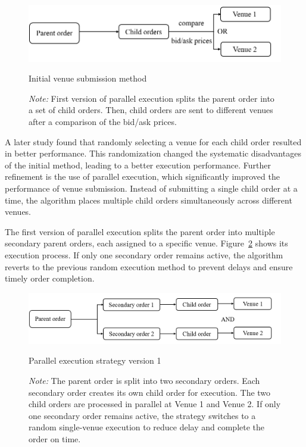 \begin{figure}[tbp]
    \centering
    \includegraphics[width=0.8\linewidth]{figures/venue_submission_1.png}
    \caption{Initial venue submission method}
    \caption*{\textit{Note:} First version of parallel execution splits the parent order into a set of child orders. Then, child orders are sent to different venues after a comparison of the bid/ask prices.}
    \label{fig:venue_submission_1}
\end{figure}

A later study \citep{romy2023} found that randomly selecting a venue for each child order resulted in better performance. This randomization changed the systematic disadvantages of the initial method, leading to a better execution performance. Further refinement is the use of parallel execution, which significantly improved the performance of venue submission. Instead of submitting a single child order at a time, the algorithm places multiple child orders simultaneously across different venues. 

The first version of parallel execution splits the parent order into multiple secondary parent orders, each assigned to a specific venue. Figure~\ref{fig:venue_submission_2} shows its execution process. If only one secondary order remains active, the algorithm reverts to the previous random execution method to prevent delays and ensure timely order completion. 

\begin{figure}[tbp]
    \centering
    \includegraphics[width=0.8\linewidth]{figures/venue_submission_2.png}
    \caption{Parallel execution strategy version 1}
    \caption*{\textit{Note:} The parent order is split into two secondary orders. Each secondary order creates its own child order for execution. The two child orders are processed in parallel at Venue 1 and Venue 2. If only one secondary order remains active, the strategy switches to a random single-venue execution to reduce delay and complete the order on time.}
    \label{fig:venue_submission_2}
\end{figure}


